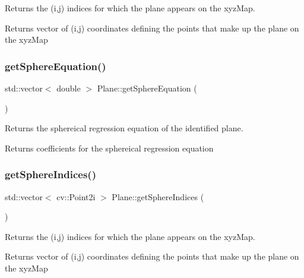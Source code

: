 Returns the (i,j) indices for which the plane appears on the xyz\+Map. 

\begin{DoxyReturn}{Returns}
vector of (i,j) coordinates defining the points that make up the plane on the xyz\+Map 
\end{DoxyReturn}
\hypertarget{class_plane_ab82069a9be653b07a589374c03b2f436}{}\label{class_plane_ab82069a9be653b07a589374c03b2f436} 
\subsubsection{\texorpdfstring{get\+Sphere\+Equation()}{getSphereEquation()}}
{\footnotesize\ttfamily std\+::vector$<$ double $>$ Plane\+::get\+Sphere\+Equation (\begin{DoxyParamCaption}{ }\end{DoxyParamCaption})}



Returns the sphereical regression equation of the identified plane. 

\begin{DoxyReturn}{Returns}
coefficients for the sphereical regression equation 
\end{DoxyReturn}
\hypertarget{class_plane_acd72c8d01f393ef78c4ed1f685d1d36d}{}\label{class_plane_acd72c8d01f393ef78c4ed1f685d1d36d} 
\subsubsection{\texorpdfstring{get\+Sphere\+Indices()}{getSphereIndices()}}
{\footnotesize\ttfamily std\+::vector$<$ cv\+::\+Point2i $>$ Plane\+::get\+Sphere\+Indices (\begin{DoxyParamCaption}{ }\end{DoxyParamCaption})}



Returns the (i,j) indices for which the plane appears on the xyz\+Map. 

\begin{DoxyReturn}{Returns}
vector of (i,j) coordinates defining the points that make up the plane on the xyz\+Map 
\end{DoxyReturn}
\hypertarget{class_plane_ab884c9687d63290912707f749adad115}{}\label{class_plane_ab884c9687d63290912707f749adad115} 
